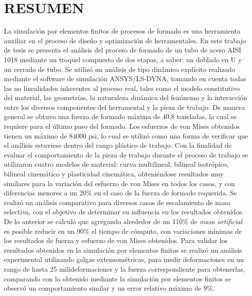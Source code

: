 \chapter*{RESUMEN}


La simulación por elementos finitos de procesos de formado es una herramienta auxiliar en el proceso de 
diseño y optimización de herramentales. En este trabajo de tesis se presenta el análisis del proceso de formado 
de un tubo de acero AISI 1018 mediante un troquel compuesto de dos etapas, a saber: un doblado en U y un 
cerrado de tubo. Se utilizó un análisis de tipo dinámico explícito realizado mediante el software de simulación 
ANSYS/LS-DYNA\CR, tomando en cuenta todas las no linealidades inherentes al proceso real, tales 
como el modelo constitutivo del material, las geometrías, la naturaleza dinámica del fenónemo y la interacción 
entre los diversos componentes del herramental y la pieza de trabajo.
De manera general se obtuvo una fuerza de formado máxima de 40.8 toneladas, la cual se requiere para el último 
paso del formado. Los esfuerzos de von Mises obtenidos tienen un máximo de 84000 psi, lo cual se utilizó 
como una forma de verificar que el análisis estuviese dentro del rango plástico de trabajo.
Con la finalidad de evaluar el comportamiento de la pieza de trabajo durante el proceso de trabajo se 
utilizaron cuatro modelos de material: curva multilineal, bilineal isotrópico, bilineal cinemático y 
plasticidad cinemática, obteniéndose resultados muy similares para la variación del esfuerzo de von Mises 
en todos los casos, y con diferencias menores a un 20\% en el caso de la fuerza de formado requerida. 
Se realizó un análisis comparativo para diversos casos de escalamiento de masa selectiva, con el objetivo 
de determinar su influencia en los resultados obtenidos. De lo anterior se calculó que agregando alrededor de 
un 110\% de \textit{masa artificial} es posible reducir en un 90\% el tiempo de cómputo, con variaciones mínimas 
de los resultados de fuerza y esfuerzo de von Mises obtenidos. Para validar los resultados obtenidos en la simulación 
por elementos finitos se realizó un análisis experimental utilizando 
galgas extensométricas, para medir deformaciones en un rango de hasta 25 milideformaciones y la fuerza correspondiente 
para obtenerlas, comparando con lo obtenido mediante la simulación por elementos finitos se observó un 
comportamiento similar y un error relativo máximo de 9\%.
